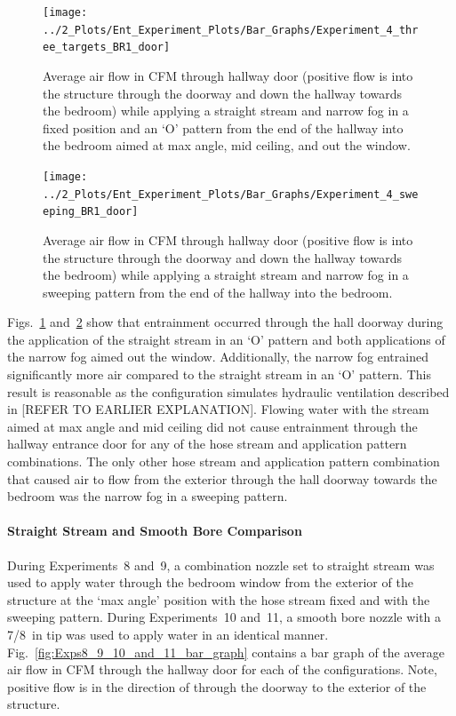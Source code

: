 \documentclass[12pt,oneside]{book}
\begin{document}
\begin{figure}[!ht]
	\centering
	\texttt{[image: ../2\_Plots/Ent\_Experiment\_Plots/Bar\_Graphs/Experiment\_4\_three\_targets\_BR1\_door]}
	\caption{Average air flow in CFM through hallway door (positive flow is into the structure through the doorway and down the hallway towards the bedroom) while applying a straight stream and narrow fog in a fixed position and an `O' pattern from the end of the hallway into the bedroom aimed at max angle, mid ceiling, and out the window.}
	\label{fig:Exp4_three targets_bar_graph}
\end{figure}

\begin{figure}[!ht]
	\centering
	\texttt{[image: ../2\_Plots/Ent\_Experiment\_Plots/Bar\_Graphs/Experiment\_4\_sweeping\_BR1\_door]}
	\caption{Average air flow in CFM through hallway door (positive flow is into the structure through the doorway and down the hallway towards the bedroom) while applying a straight stream and narrow fog in a sweeping pattern from the end of the hallway into the bedroom.}
	\label{fig:Exp4_sweeping_bar_graph}
\end{figure}

Figs.~\ref{fig:Exp4_three targets_bar_graph} and~\ref{fig:Exp4_sweeping_bar_graph} show that entrainment occurred through the hall doorway during the application of the straight stream in an `O' pattern and both applications of the narrow fog aimed out the window. Additionally, the narrow fog entrained significantly more air compared to the straight stream in an `O' pattern. This result is reasonable as the configuration simulates hydraulic ventilation described in [REFER TO EARLIER EXPLANATION]. Flowing water with the stream aimed at max angle and mid ceiling did not cause entrainment through the hallway entrance door for any of the hose stream and application pattern combinations. The only other hose stream and application pattern combination that caused air to flow from the exterior through the hall doorway towards the bedroom was the narrow fog in a sweeping pattern.

\FloatBarrier

\paragraph{Straight Stream and Smooth Bore Comparison} \mbox{}

During Experiments~8 and~9, a combination nozzle set to straight stream was used to apply water through the bedroom window from the exterior of the structure at the `max angle' position with the hose stream fixed and with the sweeping pattern. During Experiments~10 and~11, a smooth bore nozzle with a 7/8~in tip was used to apply water in an identical manner. Fig.~\ref{fig:Exps8_9_10_and_11_bar_graph} contains a bar graph of the average air flow in CFM through the hallway door for each of the configurations. Note, positive flow is in the direction of through the doorway to the exterior of the structure. 
\end{document}
